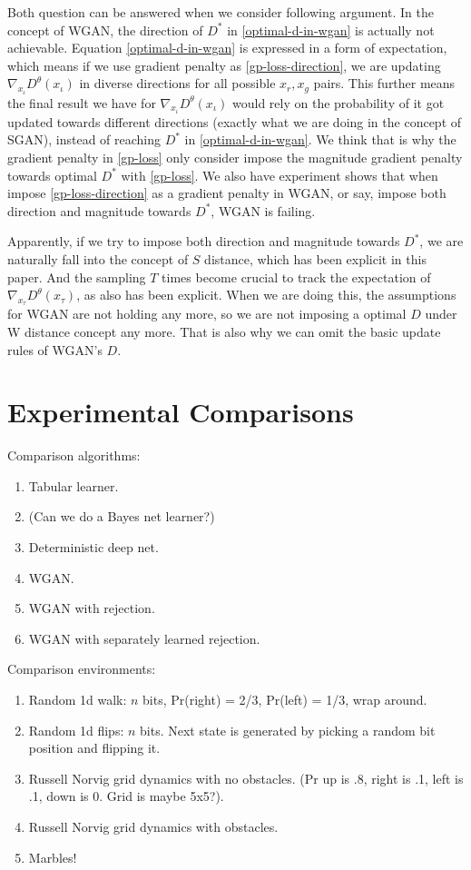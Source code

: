 \documentclass[letterpaper]{article} %
\begin{document}
Both question can be answered when we consider following argument.
In the concept of WGAN, the direction of $D^{\ast}$ in \eqref{optimal-d-in-wgan} is actually not achievable.
Equation \eqref{optimal-d-in-wgan} is expressed in a form of expectation, which means if we use gradient penalty as \eqref{gp-loss-direction}, we are updating $\nabla_{x_{\iota}}D^{\theta}(x_{\iota})$ in diverse directions for all possible $x_r,x_g$ pairs.
This further means the final result we have for $\nabla_{x_{\iota}}D^{\theta}(x_{\iota})$ would rely on the probability of it got updated towards different directions (exactly what we are doing in the concept of SGAN), instead of reaching $D^{\ast}$ in \eqref{optimal-d-in-wgan}.
We think that is why the gradient penalty in \eqref{gp-loss} only consider impose the magnitude gradient penalty towards optimal $D^{\ast}$ with \eqref{gp-loss}.
We also have experiment shows that when impose \eqref{gp-loss-direction} as a gradient penalty in WGAN, or say, impose both direction and magnitude towards $D^{\ast}$, WGAN is failing.

Apparently, if we try to impose both direction and magnitude towards $D^{\ast}$, we are naturally fall into the concept of $S$ distance, which has been explicit in this paper.
And the sampling $T$ times become crucial to track the expectation of $\nabla_{x_{\tau}}D^{\theta}(x_{\tau})$, as also has been explicit.
When we are doing this, the assumptions for WGAN are not holding any more, so we are not imposing a optimal $D$ under W distance concept any more.
That is also why we can omit the basic update rules of WGAN's $D$.

\section{Experimental Comparisons}

Comparison algorithms:
\begin{enumerate}
\item Tabular learner.
\item (Can we do a Bayes net learner?)
\item Deterministic deep net.
\item WGAN.
\item WGAN with rejection.
\item WGAN with separately learned rejection.
\end{enumerate}

Comparison environments:
\begin{enumerate}
\item Random 1d walk: $n$ bits, Pr(right) = 2/3, Pr(left) = 1/3, wrap around.
\item Random 1d flips: $n$ bits. Next state is generated by picking a random bit position and flipping it.
\item Russell Norvig grid dynamics with no obstacles. (Pr up is .8, right is .1, left is .1, down is 0. Grid is maybe 5x5?).
\item Russell Norvig grid dynamics with obstacles.
\item Marbles!
\end{enumerate}
\end{document}
